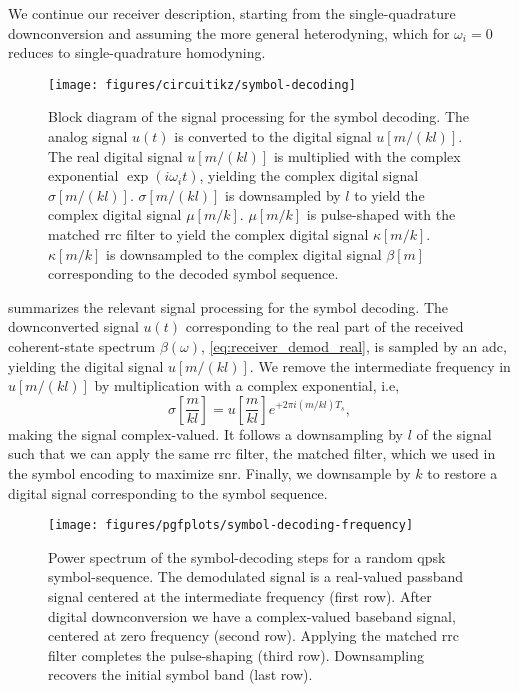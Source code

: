We continue our receiver description, starting from the single-quadrature downconversion and assuming the more general heterodyning, which for $\omega_i=0$ reduces to single-quadrature homodyning.
\begin{figure}[htb]
	\centering
	\texttt{[image: figures/circuitikz/symbol-decoding]}
	\caption{Block diagram of the signal processing for the symbol decoding. The analog signal $u(t)$ is converted to the digital signal $u[m/(kl)]$. The real digital signal $u[m/(kl)]$ is multiplied with the complex exponential $\exp(i\omega_it)$, yielding the complex digital signal $\sigma[m/(kl)]$. $\sigma[m/(kl)]$ is downsampled by $l$ to yield the complex digital signal $\mu[m/k]$. $\mu[m/k]$ is pulse-shaped with the matched \gls{rrc} filter to yield the complex digital signal $\kappa[m/k]$. $\kappa[m/k]$ is downsampled to the complex digital signal $\beta[m]$ corresponding to the decoded symbol sequence.}\label{fig:symbol_decoding_blocks}
\end{figure}
 summarizes the relevant signal processing for the symbol decoding.
The downconverted signal $u(t)$ corresponding to the real part of the received coherent-state spectrum $\beta(\omega)$, \cref{eq:receiver_demod_real}, is sampled by an \gls{adc}, yielding the digital signal $u[m/(kl)]$.
We remove the intermediate frequency in $u[m/(kl)]$ by multiplication with a complex exponential, i.e,
\begin{equation}
	\sigma\left[\frac{m}{kl}\right]
	=
	u\left[\frac{m}{kl}\right]
	e^{+2\pi i (m/kl) T_s}
	,
\end{equation}
making the signal complex-valued.
It follows a downsampling by $l$ of the signal such that we can apply the same \gls{rrc} filter, the matched filter, which we used in the symbol encoding to maximize \gls{snr}.
Finally, we downsample by $k$ to restore a digital signal corresponding to the symbol sequence.
\begin{figure}[htb]
	\centering
	\texttt{[image: figures/pgfplots/symbol-decoding-frequency]}
	\caption{Power spectrum of the symbol-decoding steps for a random \gls{qpsk} symbol-sequence. The demodulated signal is a real-valued passband signal centered at the intermediate frequency (first row). After digital downconversion we have a complex-valued baseband signal, centered at zero frequency (second row). Applying the matched \gls{rrc} filter completes the pulse-shaping (third row). Downsampling recovers the initial symbol band (last row).}\label{fig:symbol_decoding_frequency}
\end{figure}
